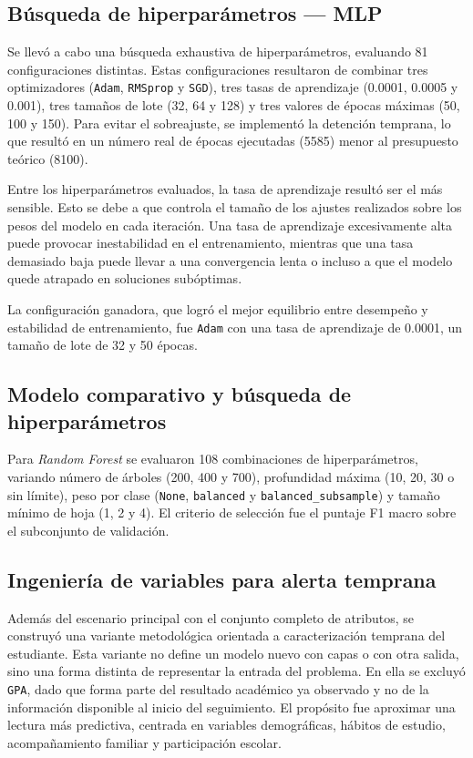 \documentclass[conference]{IEEEtran}
\begin{document}
\subsection{Búsqueda de hiperparámetros --- MLP}

Se llevó a cabo una búsqueda exhaustiva de hiperparámetros, evaluando 81 configuraciones distintas. Estas configuraciones resultaron de combinar tres optimizadores (\texttt{Adam}, \texttt{RMSprop} y \texttt{SGD}), tres tasas de aprendizaje (0.0001, 0.0005 y 0.001), tres tamaños de lote (32, 64 y 128) y tres valores de épocas máximas (50, 100 y 150). Para evitar el sobreajuste, se implementó la detención temprana, lo que resultó en un número real de épocas ejecutadas (5585) menor al presupuesto teórico (8100).

Entre los hiperparámetros evaluados, la tasa de aprendizaje resultó ser el más sensible. Esto se debe a que controla el tamaño de los ajustes realizados sobre los pesos del modelo en cada iteración. Una tasa de aprendizaje excesivamente alta puede provocar inestabilidad en el entrenamiento, mientras que una tasa demasiado baja puede llevar a una convergencia lenta o incluso a que el modelo quede atrapado en soluciones subóptimas.

La configuración ganadora, que logró el mejor equilibrio entre desempeño y estabilidad de entrenamiento, fue \texttt{Adam} con una tasa de aprendizaje de 0.0001, un tamaño de lote de 32 y 50 épocas.

\subsection{Modelo comparativo y búsqueda de hiperparámetros}

Para \textit{Random Forest} se evaluaron 108 combinaciones de hiperparámetros, variando número de árboles (200, 400 y 700), profundidad máxima (10, 20, 30 o sin límite), peso por clase (\texttt{None}, \texttt{balanced} y \texttt{balanced\_subsample}) y tamaño mínimo de hoja (1, 2 y 4). El criterio de selección fue el puntaje F1 macro sobre el subconjunto de validación.

\subsection{Ingeniería de variables para alerta temprana}

Además del escenario principal con el conjunto completo de atributos, se construyó una variante metodológica orientada a caracterización temprana del estudiante. Esta variante no define un modelo nuevo con capas o con otra salida, sino una forma distinta de representar la entrada del problema. En ella se excluyó \texttt{GPA}, dado que forma parte del resultado académico ya observado y no de la información disponible al inicio del seguimiento. El propósito fue aproximar una lectura más predictiva, centrada en variables demográficas, hábitos de estudio, acompañamiento familiar y participación escolar.
\end{document}
